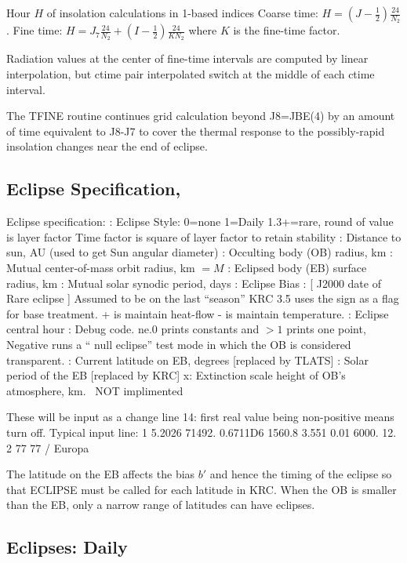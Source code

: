 \documentclass{article}
\begin{document}
 Hour $H$ of insolation calculations in 1-based indices
\qi Coarse time: $H=(J-\frac{1}{2})\frac{24}{N_2}$.
\qi Fine time: $H=J_7 \frac{24}{N_2} + (I-\frac{1}{2})\frac{24}{K N_2}$ where $K$ is the fine-time factor.

 Radiation values at the center of fine-time intervals are computed by linear
 interpolation, but ctime pair interpolated switch at the middle of each ctime
 interval.

The TFINE routine continues grid calculation beyond J8=JBE(4) by an amount of time
equivalent to J8-J7 to cover the thermal response to the possibly-rapid
insolation changes near the end of eclipse.

\subsection{Eclipse Specification, \label{eline}}

Eclipse specification: 
:  Eclipse Style: 0=none  1=Daily  1.3+=rare, round of value is layer factor
\qii Time factor is square of layer factor to retain stability
:  Distance to sun,  AU (used to get  Sun angular diameter)
:  Occulting body (OB) radius, km
:  Mutual center-of-mass orbit radius, km $=M$
:  Eclipsed body (EB) surface radius, km
:  Mutual solar synodic period, days
:  Eclipse Bias
:  [ J2000 date of Rare eclipse ] Assumed to be on the last ``season''
\qii KRC 3.5 uses the sign as a flag for base treatment. + is maintain heat-flow
 - is maintain temperature. 
:  Eclipse central hour
:  Debug code.  ne.0 prints constants and $>1$ prints one point,
\qii Negative runs a `` null eclipse'' test mode in which the OB is considered transparent.
: Current latitude on EB, degrees [replaced by TLATS]
: Solar period of the EB  [replaced by KRC]
\qi x:  Extinction scale height of  OB's atmosphere, km. \  NOT implimented 

These will be input as a change line 14: first real value being non-positive means turn off.  Typical input line: 
  1 5.2026 71492. 0.6711D6 1560.8 3.551 0.01 6000. 12.  2 77 77 / Europa

The latitude on the EB affects the bias $b'$ and hence the timing of the eclipse
so that ECLIPSE must be called for each latitude in KRC. When the OB is smaller
than the EB, only a narrow range of latitudes can have eclipses.

\subsection{Eclipses: Daily}
\end{document}
